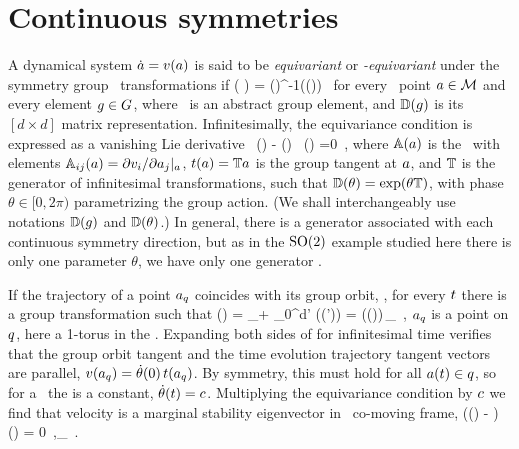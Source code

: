 \section{Continuous symmetries}
\label{s:symm}

A dynamical system $\dot{a}={v}(a)$ is said to be
\emph{equivariant} or \emph{\Group-equivariant} under the
symmetry group \Group\ transformations if
\beq
	\vel( \ssp )
    =  \matrixRep(\LieEl)^{-1}\vel(\matrixRep(\LieEl)\ssp)
	\,
for every \statesp\ point $a \in {\cal M}$ and every element $g \in
G$, where \LieEl\ is an abstract group element, and
$\mathbb{D}(g)$ is its $[d\!\times\!d]$ matrix representation.
Infinitesimally, the equivariance condition  is expressed as
a vanishing Lie derivative
\beq
  \Lg \, \vel(\ssp)  - \Mvar(\ssp) \, \groupTan(\ssp) =0
  \,,
where
$\mathbb{A}(a)$ is the \stabmat\, with elements
$\mathbb{A}_{ij}(a)={\partial {v}_i}/{\partial a_j}|_{a}$,
$ t(a) = \mathbb{T} a $ is the group tangent at $a$,
and $\mathbb{T}$ is the generator of infinitesimal transformations, such that
$\mathbb{D}(\theta) = \exp(\theta\mathbb{T})$, with phase $\theta \in [0,2\pi)$
parametrizing the group action. (We shall interchangeably use notations
$\mathbb{D}(g)$ and $\mathbb{D}(\theta)$.) In general, there is a
generator associated with each continuous symmetry direction, but as in
the $\textrm{SO}(2)$ example studied here there is only one parameter $\theta$,
we have only one generator \Lg.

If the trajectory of a point $a_q$ coincides with its group
orbit, \ie, for every $t$ there is a group transformation such that
\beq
\ssp (\zeit)
    = \ssp_\stagn + \int_0^\zeit \!\!d\zeit' \vel(\ssp (\zeit'))
    = \matrixRep(\theta (\zeit))\,\ssp_\stagn
  \,,
$a_q$ is a point on \emph{\reqv} $q$, here a 1-torus in the
\statesp. Expanding both sides of  for infinitesimal time
verifies that the group orbit tangent and the time evolution trajectory
tangent vectors are parallel,
${v}(a_q) = \dot{\theta}(0) \, t(a_q)$.
By symmetry, this must hold for all $a(t) \in q$, so for a \reqv\
the \emph{\phaseVel} is a constant, $\dot{\theta}(t) = c$.
Multiplying the equivariance condition \refeq{inftmInv} by $c$ we
find that velocity is a marginal stability eigenvector in \reqv\
co-moving frame,
\beq
(\Mvar (\ssp) - \velRel \Lg) \vel (\ssp) = 0
\,,\qquad \ssp \in \pS_\stagn
\,.

